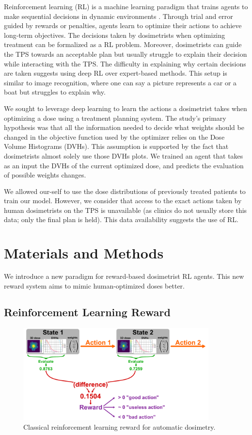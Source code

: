 Reinforcement learning (RL) is a machine learning paradigm that trains agents to make sequential decisions in dynamic environments \cite{brooks_what_2021}.
Through trial and error guided by rewards or penalties, agents learn to optimize their actions to achieve long-term objectives.
The decisions taken by dosimetrists when optimizing treatment can be formalized as a RL problem.
Moreover, dosimetrists can guide the TPS towards an acceptable plan but usually struggle to explain their decision while interacting with the TPS.
The difficulty in explaining why certain decisions are taken suggests using deep RL over expert-based methods.
This setup is similar to image recognition, where one can say a picture represents a car or a boat but struggles to explain why.

We sought to leverage deep learning to learn the actions a dosimetrist takes when optimizing a dose using a treatment planning system.
The study’s primary hypothesis was that all the information needed to decide what weights should be changed in the objective function used by the optimizer relies on the Dose Volume Histograms (DVHs).
This assumption is supported by the fact that dosimetrists almost solely use those DVHs plots.
We trained an agent that takes as an input the DVHs of the current optimized dose, and predicts the evaluation of possible weights changes.

We allowed our-self to use the dose distributions of previously treated patients to train our model.
However, we consider that access to the exact actions taken by human dosimetrists on the TPS is unavailable (as clinics do not usually store this data; only the final plan is held).
This data availability suggests the use of RL.

\section{Materials and Methods}
We introduce a new paradigm for reward-based dosimetrist RL agents.
This new reward system aims to mimic human-optimized doses better.

\subsection{Reinforcement Learning Reward}

\begin{figure}
	\centering
	\includegraphics[width=0.9\textwidth]{reward.pdf}
	\caption{Classical reinforcement learning reward for automatic dosimetry.}
	\label{fig:reward_fig}
\end{figure}

